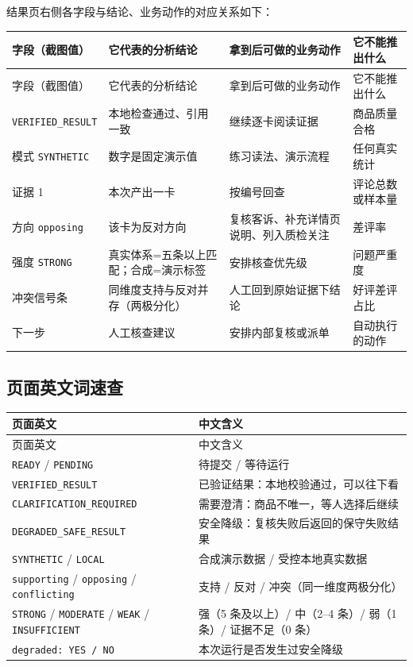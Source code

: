 结果页右侧各字段与结论、业务动作的对应关系如下：

\begin{longtable}{>{\raggedright\arraybackslash}p{}>{\raggedright\arraybackslash}p{}>{\raggedright\arraybackslash}p{}>{\raggedright\arraybackslash}p{}}
\toprule
字段（截图值） & 它代表的分析结论 & 拿到后可做的业务动作 & 它不能推出什么 \\
\midrule
\endfirsthead
\toprule
字段（截图值） & 它代表的分析结论 & 拿到后可做的业务动作 & 它不能推出什么 \\
\midrule
\endhead
\texttt{VERIFIED\_RESULT} & 本地检查通过、引用一致 & 继续逐卡阅读证据 & 商品质量合格 \\
模式 \texttt{SYNTHETIC} & 数字是固定演示值 & 练习读法、演示流程 & 任何真实统计 \\
证据 1 & 本次产出一卡 & 按编号回查 & 评论总数或样本量 \\
方向 \texttt{opposing} & 该卡为反对方向 & 复核客诉、补充详情页说明、列入质检关注 & 差评率 \\
强度 \texttt{STRONG} & 真实体系=五条以上匹配；合成=演示标签 & 安排核查优先级 & 问题严重度 \\
冲突信号条 & 同维度支持与反对并存（两极分化） & 人工回到原始证据下结论 & 好评差评占比 \\
下一步 & 人工核查建议 & 安排内部复核或派单 & 自动执行的动作 \\
\bottomrule
\end{longtable}

\subsection{页面英文词速查}

\begin{longtable}{>{\raggedright\arraybackslash}p{}>{\raggedright\arraybackslash}p{}}
\toprule
页面英文 & 中文含义 \\
\midrule
\endfirsthead
\toprule
页面英文 & 中文含义 \\
\midrule
\endhead
\texttt{READY} / \texttt{PENDING} & 待提交 / 等待运行 \\
\texttt{VERIFIED\_RESULT} & 已验证结果：本地校验通过，可以往下看 \\
\texttt{CLARIFICATION\_REQUIRED} & 需要澄清：商品不唯一，等人选择后继续 \\
\texttt{DEGRADED\_SAFE\_RESULT} & 安全降级：复核失败后返回的保守失败结果 \\
\texttt{SYNTHETIC} / \texttt{LOCAL} & 合成演示数据 / 受控本地真实数据 \\
\texttt{supporting} / \texttt{opposing} / \texttt{conflicting} & 支持 / 反对 / 冲突（同一维度两极分化） \\
\texttt{STRONG} / \texttt{MODERATE} / \texttt{WEAK} / \texttt{INSUFFICIENT} & 强（5 条及以上）/ 中（2--4 条）/ 弱（1 条）/ 证据不足（0 条） \\
\texttt{degraded: YES / NO} & 本次运行是否发生过安全降级 \\
\bottomrule
\end{longtable}

